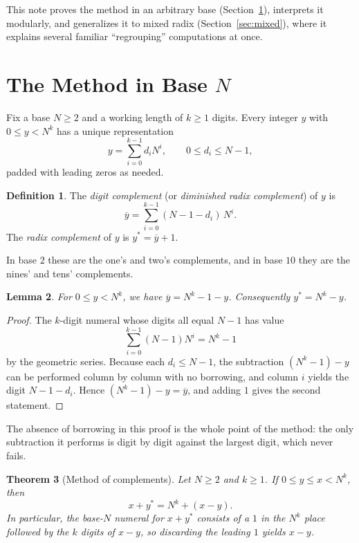 \documentclass[11pt]{amsart}
\newtheorem{theorem}{Theorem}[section]
\newtheorem{lemma}[theorem]{Lemma}
\theoremstyle{definition}
\newtheorem{definition}[theorem]{Definition}
\theoremstyle{remark}
\newcommand{\dc}[1]{\overline{#1}}   %
\newcommand{\rc}[1]{#1^{\ast}}       %
\begin{document}
This note proves the method in an arbitrary base (Section~\ref{sec:base}),
interprets it modularly, and generalizes it to mixed radix
(Section~\ref{sec:mixed}), where it explains several familiar ``regrouping''
computations at once.

\section{The Method in Base \texorpdfstring{$N$}{N}}\label{sec:base}

Fix a base $N \ge 2$ and a working length of $k \ge 1$ digits. Every integer $y$
with $0 \le y < N^k$ has a unique representation
\[
  y = \sum_{i=0}^{k-1} d_i N^i, \qquad 0 \le d_i \le N-1,
\]
padded with leading zeros as needed.

\begin{definition}
The \emph{digit complement} (or \emph{diminished radix complement}) of $y$ is
\[
  \dc{y} = \sum_{i=0}^{k-1} (N-1-d_i)\, N^i .
\]
The \emph{radix complement} of $y$ is $\rc{y} = \dc{y} + 1$.
\end{definition}

In base $2$ these are the one's and two's complements, and in base $10$ they are
the nines' and tens' complements.

\begin{lemma}\label{lem:dc}
For $0 \le y < N^k$, we have $\dc{y} = N^k - 1 - y$. Consequently
$\rc{y} = N^k - y$.
\end{lemma}

\begin{proof}
The $k$-digit numeral whose digits all equal $N-1$ has value
\[
  \sum_{i=0}^{k-1} (N-1)N^i = N^k - 1
\]
by the geometric series. Because each $d_i \le N-1$, the subtraction
$(N^k-1) - y$ can be performed column by column with no borrowing, and column $i$
yields the digit $N-1-d_i$. Hence $(N^k - 1) - y = \dc{y}$, and adding $1$ gives
the second statement.
\end{proof}

The absence of borrowing in this proof is the whole point of the method: the
only subtraction it performs is digit by digit against the largest digit, which
never fails.

\begin{theorem}[Method of complements]\label{thm:main}
Let $N \ge 2$ and $k \ge 1$. If $0 \le y \le x < N^k$, then
\[
  x + \rc{y} = N^k + (x - y).
\]
In particular, the base-$N$ numeral for $x + \rc{y}$ consists of a $1$ in the
$N^k$ place followed by the $k$ digits of $x - y$, so discarding the leading $1$
yields $x - y$.
\end{theorem}
\end{document}
